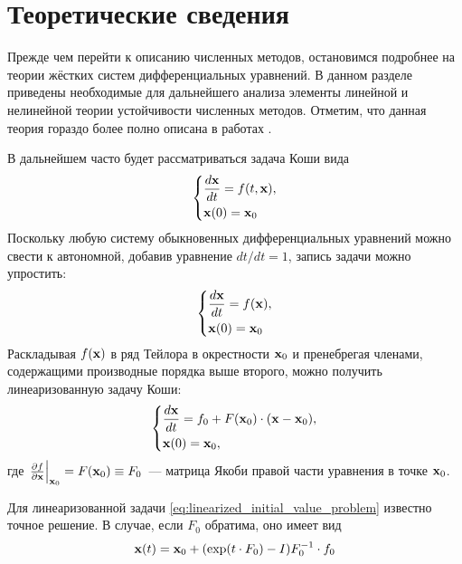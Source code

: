 \chapter{Теоретические сведения}
\label{chapter:theory} 

Прежде чем перейти к описанию численных методов, остановимся подробнее на теории жёстких систем дифференциальных уравнений.
В данном разделе приведены необходимые для дальнейшего анализа элементы линейной и нелинейной теории устойчивости численных методов.
Отметим, что данная теория гораздо более полно описана в работах \cite{heirer1999solvingode2, lambert1991methods}.

В дальнейшем часто будет рассматриваться задача Коши вида
%
\begin{equation}
    \label{eq:initial_value_problem}
    \begin{dcases}
        \frac{d \mathbf{x}}{d t} = f(t, \mathbf{x}), \\
        \mathbf{x}(0) = \mathbf{x}_0
    \end{dcases}
\end{equation}
%
Поскольку любую систему обыкновенных дифференциальных уравнений можно свести к автономной, добавив уравнение $ dt / dt = 1 $,
запись задачи можно упростить:
%
\begin{equation}
    \label{eq:autonomous_initial_value_problem}
    \begin{dcases}
        \frac{d \mathbf{x}}{d t} = f(\mathbf{x}), \\
        \mathbf{x}(0) = \mathbf{x}_0
    \end{dcases}
\end{equation}
%
Раскладывая $ f(\mathbf{x}) $ в ряд Тейлора в окрестности $ \mathbf{x}_0 $ и пренебрегая членами, содержащими производные порядка выше второго, можно получить линеаризованную задачу Коши:
%
\begin{equation}
    \label{eq:linearized_initial_value_problem}
    \begin{dcases}
        \frac{d \mathbf{x}}{d t} = f_0 + F(\mathbf{x}_0) \cdot (\mathbf{x} - \mathbf{x}_0), \\
        \mathbf{x}(0) = \mathbf{x}_0,
    \end{dcases}
\end{equation}
%
где $ \left. \frac{\partial f}{\partial \mathbf{x}} \right|_{\mathbf{x}_0} = F(\mathbf{x}_0) \equiv F_0 $~--- матрица Якоби правой части уравнения в точке $ \mathbf{x}_0 $.

Для линеаризованной задачи \eqref{eq:linearized_initial_value_problem} известно точное решение.
В случае, если $ F_0 $ обратима, оно имеет вид
\begin{equation}
    \label{eq:linearized_solution}
    \mathbf{x}(t) = \mathbf{x}_0 + (\exp(t \cdot F_0) - I) F_0^{-1} \cdot f_0
\end{equation}

